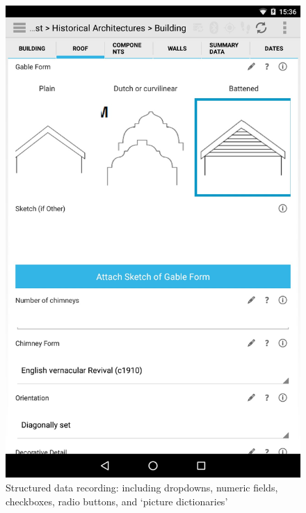 \documentclass[preprint,12pt, a4paper]{elsarticle}
\begin{document}
\begin{figure}[!htb]
	\includegraphics[width=\linewidth]{image-0.jpg}
	\caption{Structured data recording: including dropdowns, numeric fields, checkboxes, radio buttons, and `picture dictionaries'}
	\label{fig:img0}
\endminipage\hfill
{}

\end{figure}
\end{document}
